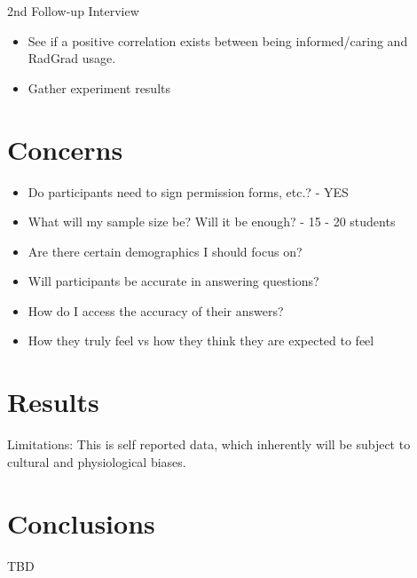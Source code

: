 \documentclass[english]{proposalnsf}
\begin{document}
  2nd Follow-up Interview
  \begin{itemize}
    \item See if a positive correlation exists between being informed/caring and RadGrad usage.
    \item Gather experiment results
  \end{itemize}

  \section{Concerns}
  \label{questions-concerns}

  \begin{itemize}
    \item Do participants need to sign permission forms, etc.? - YES
    \item What will my sample size be? Will it be enough? - 15 - 20 students
    \item Are there certain demographics I should focus on?
    \item Will participants be accurate  in answering questions?
    \item How do I access the accuracy of their answers?
    \item How they truly feel vs how they think they are expected to feel
  \end{itemize}

  \section{Results}
  \label{results}

  Limitations: This is self reported data, which inherently will be subject to cultural and physiological biases.

  \section{Conclusions}
  \label{conclusions}

  TBD

  
  

  \appendix
\end{document}
